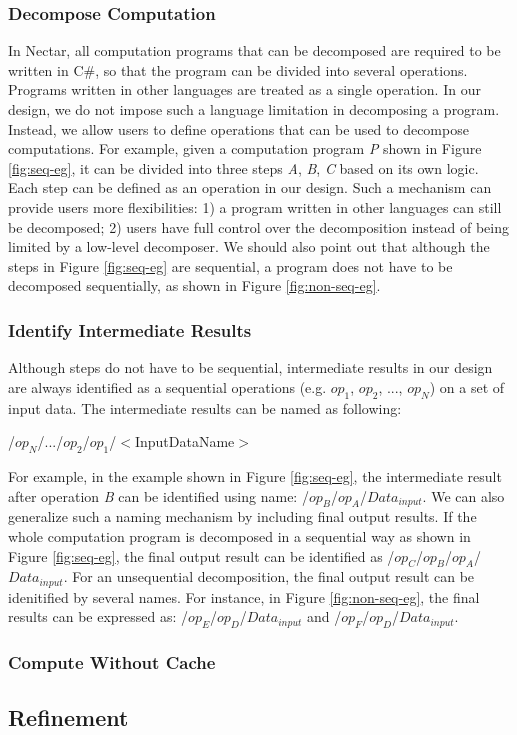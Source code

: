 \documentclass[journal]{IEEEtran}
\begin{document}
\subsubsection{Decompose Computation}
In Nectar, all computation programs that can be decomposed are required to be
written in C\#, so that the program can be divided into several operations.
Programs written in other languages are treated as a single operation.  In our
design, we do not impose such a language limitation in decomposing a program.
Instead, we allow users to define operations that can be used to decompose
computations.  For example, given a computation program {\it P} shown in Figure
\ref{fig:seq-eg}, it can be divided into three steps {\it A}, {\it B}, {\it C}
based on its own logic.  Each step can be defined as an operation in our design.
Such a mechanism can provide users more flexibilities: 1) a program written in
other languages can still be decomposed; 2) users have full control over the
decomposition instead of being limited by a low-level decomposer.  We should
also point out that although the steps in Figure \ref{fig:seq-eg} are
sequential, a program does not have to be decomposed sequentially, as shown in
Figure \ref{fig:non-seq-eg}.

\subsubsection{Identify Intermediate Results}
Although steps do not have to be sequential, intermediate results in our design
are always identified as a sequential operations (e.g. $op_1$, $op_2$, ..., $op_N$) on a
set of input data.  The intermediate results can be named as following:
\begin{center}
/$op_N$/.../$op_2$/$op_1$/$<$InputDataName$>$
\end{center}
For example, in the example shown in Figure \ref{fig:seq-eg}, the intermediate
result after operation {\it B} can be identified using name: /$op_B$/$op_A$/$
Data_{input}$.  We can also generalize such a naming mechanism by including
final output results.  If the whole computation program is decomposed in a
sequential way as shown in Figure \ref{fig:seq-eg}, the final output result can
be identified as /$op_C$/$op_B$/$op_A$/$Data_{input}$.  For an unsequential
decomposition, the final output result can be idenitified by several names.  For
instance, in Figure \ref{fig:non-seq-eg}, the final results can be expressed as:
/$op_E$/$op_D$/$Data_{input}$ and /$op_F$/$op_D$/$Data_{input}$.

\subsubsection{Compute Without Cache}
\subsection{Refinement}
\end{document}
